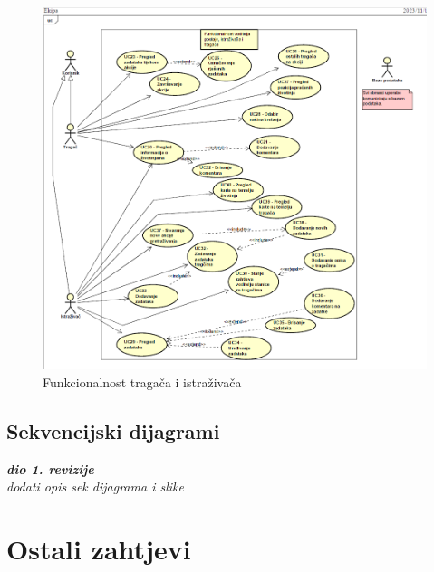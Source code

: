 					\begin{figure}[H]
						\includegraphics[scale=0.9]{slike/dijagram ekipa.png} %
						\centering
						\caption{Funkcionalnost tragača i istraživača}
						\label{fig:Funkcionalnost neregistriranog korisnika, administratora aplikacije i voditelja postaje}
					\end{figure}
				
					\eject		
				
			\subsection{Sekvencijski dijagrami}
				
				\textbf{\textit{dio 1. revizije}}\\
				
				\textit{dodati opis sek dijagrama i slike}

				\eject
	
		\section{Ostali zahtjevi}

